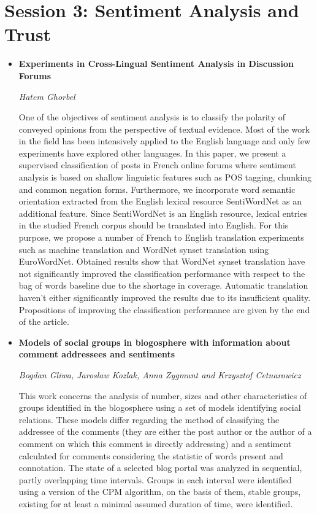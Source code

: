 \documentclass[a4paper,12pt,svgnames]{report}
\begin{document}
\section{Session 3: Sentiment Analysis and Trust}
\begin{itemize}

\item \textbf{Experiments in Cross-Lingual Sentiment Analysis in Discussion
Forums}

\textit{Hatem Ghorbel}

One of the objectives of sentiment analysis is to classify the polarity of
conveyed opinions from the perspective of textual evidence. Most of the work in
the field has been intensively applied to the English language and only few
experiments have explored other languages. In this paper, we present a
supervised classification of posts in French online forums where sentiment
analysis is based on shallow linguistic features such as POS tagging, chunking
and common negation forms. Furthermore, we incorporate word semantic orientation
extracted from the English lexical resource SentiWordNet as an additional
feature. Since SentiWordNet is an English resource, lexical entries in the
studied French corpus should be translated into English. For this purpose, we
propose a number of French to English translation experiments such as machine
translation and WordNet synset translation using EuroWordNet. Obtained results
show that WordNet synset translation have not significantly improved the
classification performance with respect to the bag of words baseline due to the
shortage in coverage. Automatic translation haven't either significantly
improved the results due to its insufficient quality. Propositions of improving
the classification performance are given by the end of the article.

\item \textbf{Models of social groups in blogosphere with information about
comment addressees and sentiments}

\textit{Bogdan Gliwa, Jaroslaw Kozlak, Anna Zygmunt and Krzysztof Cetnarowicz}

This work concerns the analysis of number, sizes and other characteristics of
groups identified in the blogosphere using a set of models identifying social
relations. These models differ regarding the method of classifying the addressee
of the comments (they are either the post author or the author of a comment on
which this comment is directly addressing) and a sentiment calculated for
comments considering the statistic of words present and connotation. The state
of a selected blog portal was analyzed in sequential, partly overlapping time
intervals. Groups in each interval were identified using a version of the CPM
algorithm, on the basis of them, stable groups, existing for at least a minimal
assumed duration of time, were identified.


\end{itemize}
\end{document}
